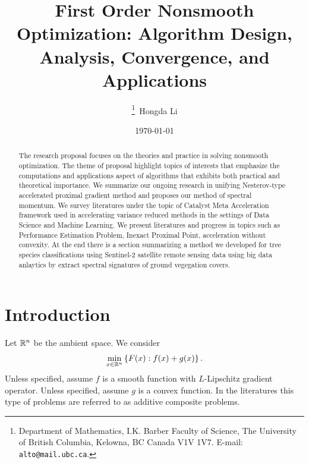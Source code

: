 \documentclass[12pt]{article}
\begin{document}
\title{
    {
        \selectfont 
        First Order Nonsmooth Optimization: 
        Algorithm Design, Analysis, Convergence, and Applications
    }
    }

\author{
    \thanks{Department of Mathematics, I.K. Barber Faculty of Science,
    The University of British Columbia, Kelowna, BC Canada V1V 1V7. 
    E-mail:  \texttt{alto@mail.ubc.ca}.}~Hongda Li
}

\date{\today}

\maketitle


\begin{abstract} 
    \noindent
    The research proposal focuses on the theories and practice in solving nonsmooth optimization. 
    The theme of proposal highlight topics of interests that emphasize the computations and applications aspect of algorithms that exhibits both practical and theoretical importance. 
    We summarize our ongoing research in unifying Nesterov-type accelerated proximal gradient method and proposes our method of spectral momentum. 
    We survey literatures under the topic of Catalyst Meta Acceleration framework used in accelerating variance reduced methods in the settings of Data Science and Machine Learning. 
    We present literatures and progress in topics such as Performance Estimation Problem, Inexact Proximal Point, acceleration without convexity. 
    At the end there is a section summarizing a method we developed for tree species classifications using Sentinel-2 satellite remote sensing data using big data anlaytics by extract spectral signatures of ground vegegation covers. 


\end{abstract}


\tableofcontents

\section{Introduction}
    Let $\mathbb R^n$ be the ambient space. We consider 
    \begin{align}
        \min_{x \in \mathbb R^n} \left\lbrace
            F(x): f(x) + g(x)
        \right\rbrace.
    \end{align}\label{eqn:additive-comp-obj}
    Unless specified, assume $f$ is a smooth function with $L$-Lipschitz gradient operator. 
    Unless specified, assume $g$ is a convex function. 
    In the literatures this type of problems are referred to as additive composite problems. 
\end{document}
